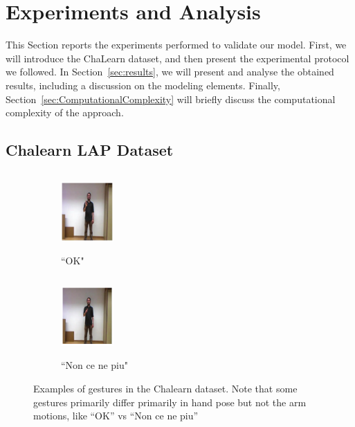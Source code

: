 

\section{Experiments and Analysis}

This Section reports the experiments performed to validate our model.
First, we will introduce the ChaLearn dataset, and then present the experimental protocol we followed.
In Section~\ref{sec:results}, we will present and analyse the obtained results, including a discussion
on the modeling elements.
Finally, Section~\ref{sec:ComputationalComplexity} will briefly discuss the computational complexity of the approach.




\subsection{Chalearn LAP Dataset}
\label{sec:chalearn}

\begin{figure}[t]
        \centering
        \begin{subfigure}[c]{.2\textwidth}
        \centering
                \includegraphics[width=2cm,height=3cm, trim=120 100 100 50, clip]{images/ok}
                \caption{``OK"}
        \end{subfigure}%
        \begin{subfigure}[c]{0.2\textwidth}
        \centering
                \includegraphics[width=2cm,height=3cm, trim=120 100 100 50, clip]{images/noncenepiu}
                \caption{``Non ce ne piu"}
        \end{subfigure}
  \caption{
Examples of gestures in the Chalearn dataset.
Note that some gestures primarily differ primarily in hand pose but not the arm motions, like ``OK'' vs ``Non ce ne piu''
  }
\label{fig:chalearnclasses}
\end{figure}




